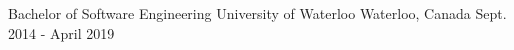 \begin{cventries}
  \cventry
    {Bachelor of Software Engineering}
    {University of Waterloo}
    {Waterloo, Canada}
    {Sept. 2014 - April 2019}
   {
    }
    
\end{cventries}
